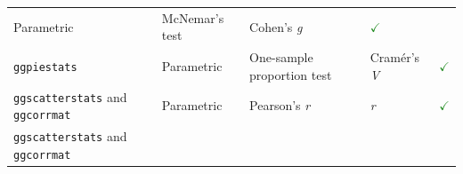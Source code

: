 \documentclass[]{article}
\begin{document}
\begin{longtable}[]{@{}lllll@{}}
\begin{minipage}[t]{0.16\columnwidth}
Parametric\strut
\end{minipage} & \begin{minipage}[t]{0.31\columnwidth}\raggedright
McNemar's test\strut
\end{minipage} & \begin{minipage}[t]{0.12\columnwidth}\raggedright
Cohen's \emph{g}\strut
\end{minipage} & \begin{minipage}[t]{0.07\columnwidth}\raggedright
\textcolor{ForestGreen}{$\checkmark$}\strut
\end{minipage}\tabularnewline
\begin{minipage}[t]{0.20\columnwidth}\raggedright
\texttt{ggpiestats}\strut
\end{minipage} & \begin{minipage}[t]{0.16\columnwidth}\raggedright
Parametric\strut
\end{minipage} & \begin{minipage}[t]{0.31\columnwidth}\raggedright
One-sample proportion test\strut
\end{minipage} & \begin{minipage}[t]{0.12\columnwidth}\raggedright
Cramér's \emph{V}\strut
\end{minipage} & \begin{minipage}[t]{0.07\columnwidth}\raggedright
\textcolor{ForestGreen}{$\checkmark$}\strut
\end{minipage}\tabularnewline
\begin{minipage}[t]{0.20\columnwidth}\raggedright
\texttt{ggscatterstats} and \texttt{ggcorrmat}\strut
\end{minipage} & \begin{minipage}[t]{0.16\columnwidth}\raggedright
Parametric\strut
\end{minipage} & \begin{minipage}[t]{0.31\columnwidth}\raggedright
Pearson's \emph{r}\strut
\end{minipage} & \begin{minipage}[t]{0.12\columnwidth}\raggedright
\emph{r}\strut
\end{minipage} & \begin{minipage}[t]{0.07\columnwidth}\raggedright
\textcolor{ForestGreen}{$\checkmark$}\strut
\end{minipage}\tabularnewline
\begin{minipage}[t]{0.20\columnwidth}\raggedright
\texttt{ggscatterstats} and \texttt{ggcorrmat}\strut
\end{minipage} & \begin{minipage}[t]{0.16\columnwidth}\raggedright

\end{minipage}
\end{longtable}
\end{document}
